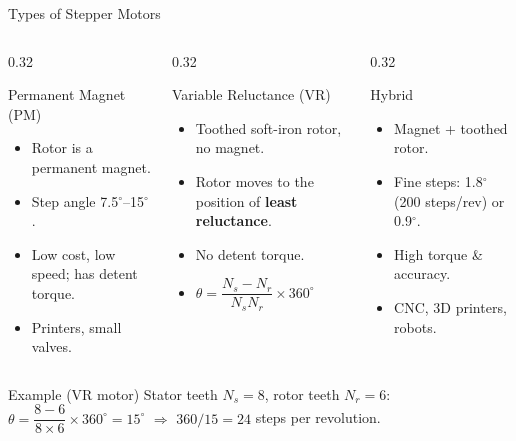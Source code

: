\documentclass[aspectratio=169]{beamer}
\begin{document}
	\begin{frame}{Types of Stepper Motors}
		\begin{columns}[T]
			\begin{column}{0.32\textwidth}
				\begin{block}{Permanent Magnet (PM)}
					\begin{itemize}\small
						\item Rotor is a permanent magnet.
						\item Step angle 7.5$^\circ$--15$^\circ$.
						\item Low cost, low speed; has detent torque.
						\item Printers, small valves.
					\end{itemize}
				\end{block}
			\end{column}
			\begin{column}{0.32\textwidth}
				\begin{block}{Variable Reluctance (VR)}
					\begin{itemize}\small
						\item Toothed soft-iron rotor, no magnet.
						\item Rotor moves to the position of \textbf{least reluctance}.
						\item No detent torque.
						\item $\theta = \dfrac{N_s - N_r}{N_s N_r}\times360^\circ$
					\end{itemize}
				\end{block}
			\end{column}
			\begin{column}{0.32\textwidth}
				\begin{block}{Hybrid}
					\begin{itemize}\small
						\item Magnet + toothed rotor.
						\item Fine steps: 1.8$^\circ$ (200 steps/rev) or 0.9$^\circ$.
						\item High torque \& accuracy.
						\item CNC, 3D printers, robots.
					\end{itemize}
				\end{block}
			\end{column}
		\end{columns}
		\vspace{0.3cm}
		\begin{block}{Example (VR motor)}
			\small Stator teeth $N_s = 8$, rotor teeth $N_r = 6$:\quad
			$\theta = \dfrac{8-6}{8\times6}\times360^\circ = \boxed{15^\circ}$ \quad $\Rightarrow$ \quad $360/15 = 24$ steps per revolution.
		\end{block}
	\end{frame}
\end{document}
